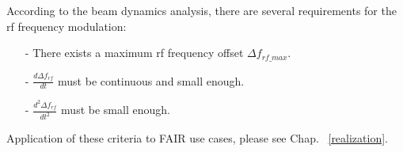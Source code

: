 According to the beam dynamics analysis, there are several requirements for the rf frequency modulation: 
\begin{itemize}
\item[-]
There exists a maximum rf frequency offset $\Delta f_\mathit{rf\_max}$. 
\item[-]
$\frac{d\Delta f_{\mathit{rf}}}{dt}$ must be continuous and small enough. 
\item[-]
$\frac{d^2\Delta f_{\mathit{rf}}}{dt^2}$ must be small enough. 
\end{itemize}
Application of these criteria to FAIR use cases, please see Chap. ~\ref{realization}.
%
%
%
%
%
%
%
%


